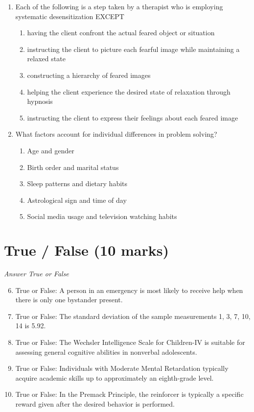 \documentclass[12pt]{article}
\begin{document}
\begin{enumerate}[label=\arabic*.]
\begin{enumerate}[label=(\alph*)]
\end{enumerate}
\item Each of the following is a step taken by a therapist who is employing systematic desensitization EXCEPT
\begin{enumerate}[label=(\alph*)]
    \item having the client confront the actual feared object or situation
    \item instructing the client to picture each fearful image while maintaining a relaxed state
    \item constructing a hierarchy of feared images
    \item helping the client experience the desired state of relaxation through hypnosis
    \item instructing the client to express their feelings about each feared image
\end{enumerate}
\item What factors account for individual differences in problem solving?
\begin{enumerate}[label=(\alph*)]
    \item Age and gender
    \item Birth order and marital status
    \item Sleep patterns and dietary habits
    \item Astrological sign and time of day
    \item Social media usage and television watching habits
\end{enumerate}
\end{enumerate}

\section*{True / False (10 marks)}
\textit{Answer True or False}
\begin{enumerate}[label=\arabic*.]
\setcounter{enumi}{5}
\item True or False: A person in an emergency is most likely to receive help when there is only one bystander present.
\item True or False: The standard deviation of the sample measurements 1, 3, 7, 10, 14 is 5.92.
\item True or False: The Wechsler Intelligence Scale for Children-IV is suitable for assessing general cognitive abilities in nonverbal adolescents.
\item True or False: Individuals with Moderate Mental Retardation typically acquire academic skills up to approximately an eighth-grade level.
\item True or False: In the Premack Principle, the reinforcer is typically a specific reward given after the desired behavior is performed.
\end{enumerate}
\end{document}
